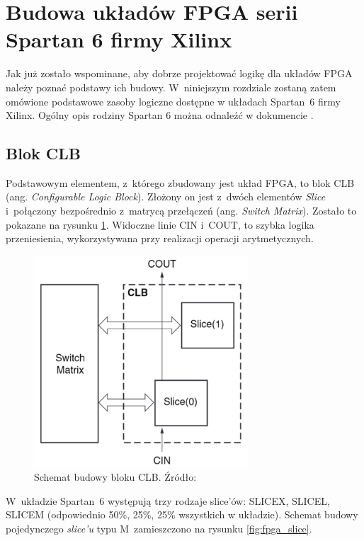 \section{Budowa układów FPGA serii Spartan 6 firmy Xilinx}
\label{sec:FPGA_SP6}

Jak już zostało wspominane, aby dobrze projektować logikę dla układów FPGA należy poznać podstawy ich budowy.
W~niniejszym rozdziale zostaną zatem omówione podstawowe zasoby logiczne dostępne w układach Spartan~6 firmy Xilinx.
Ogólny opis rodziny Spartan 6 można odnaleźć w dokumencie \cite{xilix_sp6ugCLB}.

\subsection{Blok CLB}

Podstawowym elementem, z~którego zbudowany jest układ FPGA, to blok CLB (ang. \textit{Configurable Logic Block}). 
Złożony on jest z~dwóch elementów \textit{Slice} i~połączony bezpośrednio z~matrycą przełączeń (ang. \textit{Switch Matrix}). 
Zostało to pokazane na rysunku \ref{fig:fpga_clb}. 
Widoczne linie CIN i~COUT, to szybka logika przeniesienia, wykorzystywana przy realizacji operacji arytmetycznych. 

\begin{figure}[!htb]
\label{fig:fpga_clb}
\centerline{\includegraphics[width=8cm]{introduction/images/fpga_clb}}
\caption{Schemat budowy bloku CLB. Źródło: \cite{xilix_sp6ugCLB}}
\end{figure}

W~układzie Spartan~6 występują trzy rodzaje slice'ów: SLICEX, SLICEL, SLICEM (odpowiednio 50\%, 25\%, 25\% wszystkich w układzie). 
Schemat budowy pojedynczego \textit{slice'u} typu M~zamieszczono na rysunku \ref{fig:fpga_slice}. 

